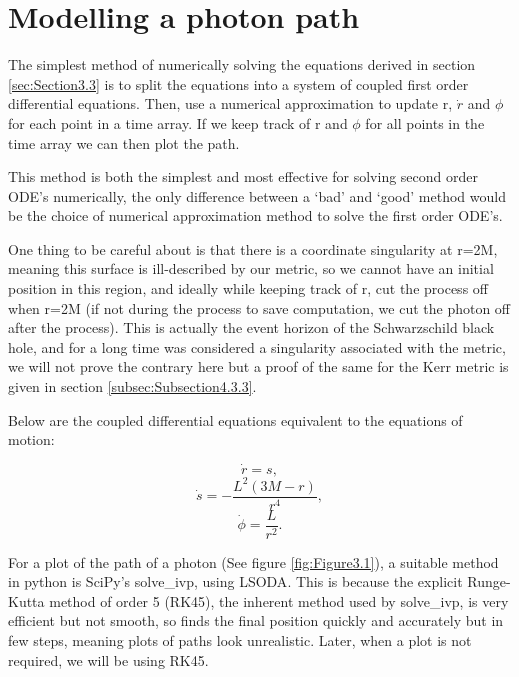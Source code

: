 \documentclass[oneside,openright,frontopenright, singlespacing]{dmathesis}
\begin{document}
\section{Modelling a photon path}\label{sec:Section3.4}

	The simplest method of numerically solving the equations derived in section \ref{sec:Section3.3} is to split the equations into a system of coupled first order differential equations. Then, use a numerical approximation to update r, $\dot{r}$ and $\phi$ for each point in a time array. If we keep track of r and $\phi$ for all points in the time array we can then plot the path.

\vspace{1em}
	This method is both the simplest and most effective for solving second order ODE’s numerically, the only difference between a ‘bad’ and ‘good’ method would be the choice of numerical approximation method to solve the first order ODE’s.

\vspace{1em}
	One thing to be careful about is that there is a coordinate singularity at r=2M, meaning this surface is ill-described by our metric, so we cannot have an initial position in this region, and ideally while keeping track of r, cut the process off when r=2M (if not during the process to save computation, we cut the photon off after the process). This is actually the event horizon of the Schwarzschild black hole, and for a long time was considered a singularity associated with the metric, we will not prove the contrary here but a proof of the same for the Kerr metric is given in section \ref{subsec:Subsection4.3.3}.

\vspace{1em}
	Below are the coupled differential equations equivalent to the equations of motion:

	\[\dot{r}= s,\]
	\[\dot{s}=-\frac{L^2(3M-r)}{r^4},\]
	\[\dot{\phi}=\frac{L}{r^2}.\]

\vspace{1em}
	For a plot of the path of a photon (See figure \ref{fig:Figure3.1}), a suitable method in python is SciPy's solve\_ivp\cite{2020SciPy-NMeth}, using LSODA\cite{hindmarsh2005lsoda}. This is because the explicit Runge-Kutta method of order 5 (RK45)\cite{fehlberg1969low}, the inherent method used by solve\_ivp, is very efficient but not smooth, so finds the final position quickly and accurately but in few steps, meaning plots of paths look unrealistic. Later, when a plot is not required, we will be using RK45.
\end{document}
